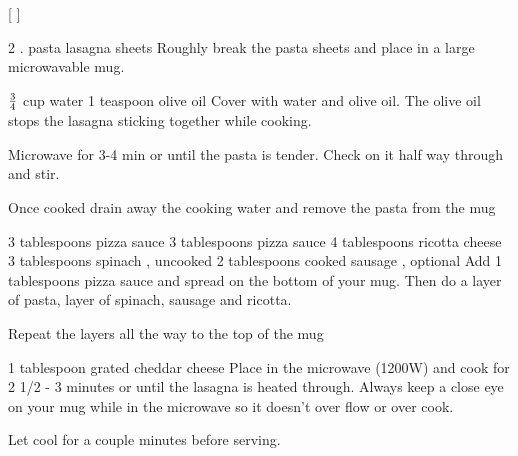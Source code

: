 
[
]

\begin{step}
2 . pasta lasagna sheets
\method
Roughly break the pasta sheets and place in a large microwavable mug.
\end{step}

\begin{step}
$\frac{3}{4}$ cup water
1 teaspoon olive oil
\method
Cover with water and olive oil. The olive oil stops the lasagna sticking together while cooking.

Microwave for 3-4 min or until the pasta is tender. Check on it half way through and stir.

Once cooked drain away the cooking water and remove the pasta from the mug
\end{step}

\begin{step}
3 tablespoons pizza sauce
3 tablespoons pizza sauce
4 tablespoons ricotta cheese
3 tablespoons spinach , uncooked
2 tablespoons cooked sausage , optional
\method
Add 1 tablespoons pizza sauce and spread on the bottom of your mug. Then do a layer of pasta, layer of spinach, sausage and ricotta.

Repeat the layers all the way to the top of the mug
\end{step}

\begin{step}
1 tablespoon grated cheddar cheese
\method
Place in the microwave (1200W) and cook for 2 1/2 - 3 minutes or until the lasagna is heated through. Always keep a close eye on your mug while in the microwave so it doesn’t over flow or over cook.

Let cool for a couple minutes before serving.
\end{step}